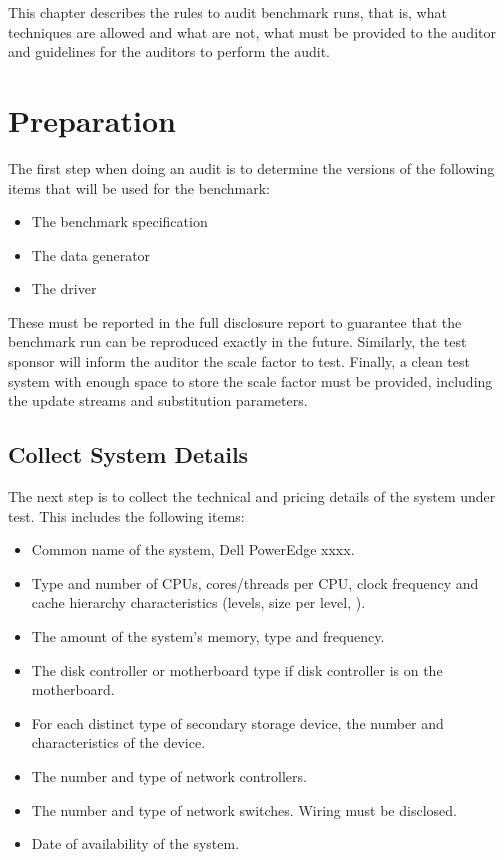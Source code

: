 

This chapter describes the rules to audit benchmark runs, that is, what
techniques are allowed and what are not, what must be provided to the auditor
and guidelines for the auditors to perform the audit.

\section{Preparation}

The first step when doing an audit is to determine the versions of the
following items that will be used for the benchmark:

\begin{itemize}
  \item The benchmark specification
  \item The data generator
  \item The driver
\end{itemize}

These must be reported in the full disclosure report to guarantee that the
benchmark run can be reproduced exactly in the future. Similarly, the test
sponsor will inform the auditor the scale factor to test. Finally, a clean test
system with enough space to store the scale factor must be provided, including
the update streams and substitution parameters.


\subsection{Collect System Details}

The next step is to collect the technical and pricing details of the system
under test. This includes the following items:

\begin{itemize}
\item Common name of the system, \eg Dell PowerEdge xxxx.
\item Type and number of CPUs, cores/threads per CPU, clock frequency and cache hierarchy characteristics (levels, size per level, \etc).
\item The amount of the system's memory, type and frequency.
\item The disk controller or motherboard type if disk controller is on the motherboard.
\item For each distinct type of secondary storage device, the number and characteristics of the device.
\item The number and type of network controllers.
\item The number and type of network switches. Wiring must be disclosed.
\item Date of availability of the system.
\end{itemize}


